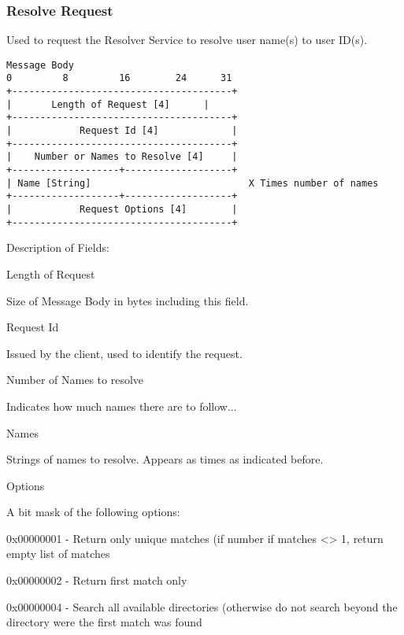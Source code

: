 \documentclass[titlepage,oneside]{book}
\begin{document}
\subsubsection{Resolve Request}

\par{} Used to request the Resolver Service to resolve user name(s) to user
ID(s).

\begin{verbatim}
Message Body
0         8         16        24      31
+---------------------------------------+
|       Length of Request [4]      |
+---------------------------------------+
|            Request Id [4]             |
+---------------------------------------+
|    Number or Names to Resolve [4]     |
+-------------------+-------------------+
| Name [String]                            X Times number of names
+-------------------+-------------------+
|            Request Options [4]        |
+---------------------------------------+
\end{verbatim}

\par{} Description of Fields:

\par{} Length of Request

\subpar{}   Size of Message Body in bytes including this field.

\par{} Request Id

\subpar{}  Issued by the client, used to identify the request.

\par{} Number of Names to resolve

\subpar{}  Indicates how much names there are to follow...

\par{} Names

\subpar{}  Strings of names to resolve. Appears as times as indicated before.

\par{} Options

\subpar{}  A bit mask of the following options:

\subpar{}    0x00000001 - Return only unique matches (if number if matches <> 1,
    return empty list of matches

\subpar{}    0x00000002 - Return first match only

\subpar{}    0x00000004 - Search all available directories (otherwise do not
    search beyond the directory were the first match was found
\end{document}
